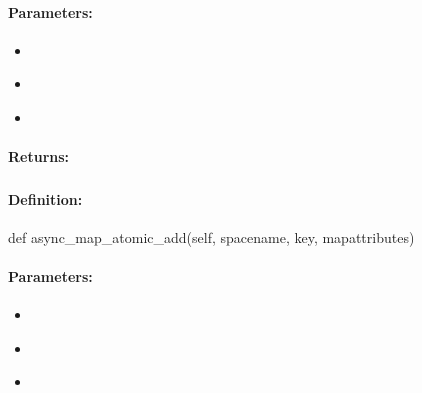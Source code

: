 \paragraph{Parameters:}
\begin{itemize}[noitemsep]
\item {}\\

\item {}\\

\item {}\\

\end{itemize}

\paragraph{Returns:}


\pagebreak
\subsubsection{}
\label{api:python:async_map_atomic_add}


\paragraph{Definition:}
\begin{pythoncode}
def async_map_atomic_add(self, spacename, key, mapattributes)
\end{pythoncode}

\paragraph{Parameters:}
\begin{itemize}[noitemsep]
\item {}\\

\item {}\\

\item {}\\

\end{itemize}

